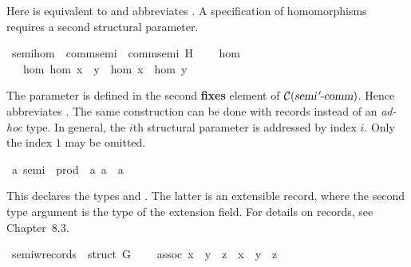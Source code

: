 \begin{isabellebody}
\begin{isamarkuptext}
Here  is equivalent to  and
  abbreviates .  A specification of homomorphisms
  requires a second structural parameter.%
\end{isamarkuptext}%
\isamarkuptrue%
\ semi{\isacharprime}{\isacharunderscore}hom\ {\isacharequal}\ comm{\isacharunderscore}semi{\isacharprime}\ {\isacharplus}\ comm{\isacharunderscore}semi{\isacharprime}\ H\ {\isacharplus}\isanewline
\ \ \ hom\isanewline
\ \ \ hom{\isacharcolon}\ {\isachardoublequote}hom\ {\isacharparenleft}x\ {\isasymstar}\ y{\isacharparenright}\ {\isacharequal}\ hom\ x\ {\isasymstar}\ hom\ y{\isachardoublequote}\isamarkupfalse%
%
\begin{isamarkuptext}%
The parameter  is defined in the second \textbf{fixes}
  element of $\mathcal{C}(\emph{\sl semi{\emph{$\mskip2mu{'}\mskip-2mu$}}{\mbox{-}}comm})$. Hence 
  abbreviates .  The same construction can be done
  with records instead of an \textit{ad-hoc} type.  In general, the
  $i$th structural parameter is addressed by index $i$.  Only the
  index $1$ may be omitted.%
\end{isamarkuptext}%
\isamarkuptrue%
\ {\isacharprime}a\ semi\ {\isacharequal}\ prod\ {\isacharcolon}{\isacharcolon}\ {\isachardoublequote}{\isacharbrackleft}{\isacharprime}a{\isacharcomma}\ {\isacharprime}a{\isacharbrackright}\ {\isasymRightarrow}\ {\isacharprime}a{\isachardoublequote}\ {\isacharparenleft}\ {\isachardoublequote}{\isasymbullet}{\isasymindex}{\isachardoublequote}\ {}{}{\isacharparenright}\isamarkupfalse%
%
\begin{isamarkuptext}%
This declares the types  and  .  The latter is an extensible record, where the second
  type argument is the type of the extension field.  For details on
  records, see \cite{NipkowEtAl2002} Chapter~8.3.%
\end{isamarkuptext}%
\isamarkuptrue%
\ semi{\isacharunderscore}w{\isacharunderscore}records\ {\isacharequal}\ struct\ G\ {\isacharplus}\isanewline
\ \ \ assoc{\isacharcolon}\ {\isachardoublequote}{\isacharparenleft}x\ {\isasymbullet}\ y{\isacharparenright}\ {\isasymbullet}\ z\ {\isacharequal}\ x\ {\isasymbullet}\ {\isacharparenleft}y\ {\isasymbullet}\ z{\isacharparenright}{\isachardoublequote}\isamarkupfalse%

\end{isabellebody}
